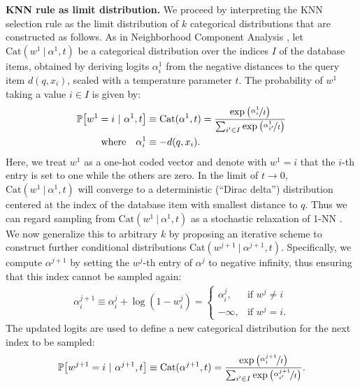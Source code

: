 \documentclass{article}
\newcommand{\myparagraph}[1]{\smallskip\noindent\textbf{#1}}
\newcommand\dist{d}
\newcommand\q{q}
\newcommand\kk{k}
\newcommand\db{x}
\newcommand\dbI{I}
\newcommand\prob{\mathbb{P}}
\newcommand\tcat{t}
\newcommand\Cat{\text{Cat}}
\newcommand\logit{\alpha}
\newcommand\w{w}
\newcommand\given{\ | \ }
\begin{document}
\myparagraph{KNN rule as limit distribution.}
We proceed by interpreting the KNN selection rule as the limit distribution of $\kk$ categorical distributions that are constructed as follows. 
As in Neighborhood Component Analysis \cite{Goldberger:2005:NCA},
let $\Cat(\w^1 \given \logit^1, \tcat)$
be a categorical distribution over the indices $\dbI$ of the database items, obtained by deriving logits $\logit^1_i$ from the negative distances to the query item $\dist(\q, \db_i)$, scaled with a temperature parameter $\tcat$. 
The probability of $\w^1$ taking a value $i \in \dbI$ is given by:
\begin{align}
\prob\big[\w^1 = i \given \logit^{1}, \tcat\big] &\equiv \Cat(\logit^1, \tcat) = 
\frac{\exp \left(\nicefrac{\logit^1_i}{\tcat} \right)}
{\sum_{i' \in \dbI} \exp \left(\nicefrac{\logit^1_{i'}}{\tcat} \right)} \\
 \text{where}\quad \logit^1_i &\equiv -\dist(\q,\db_i). \label{eq:cat_sample_1}
\end{align}
Here, we treat $\w^1$ as a one-hot coded vector and denote with $\w^1=i$ that the $i$-th entry is set to one while the others are zero. 
In the limit of $\tcat \to 0$, $\Cat(\w^1 \given \logit^1 , \tcat)$ will converge to a deterministic (``Dirac delta'') distribution centered at the index of the database item with smallest distance to $\q$.
Thus we can regard sampling from $\Cat(\w^1 \given \logit^1 , \tcat)$ as a stochastic relaxation of 1-NN \cite{Goldberger:2005:NCA}.
We now generalize this to arbitrary $k$ by proposing an iterative scheme to construct further conditional distributions $\Cat(\w^{j+1} \given \logit^{j+1}, \tcat)$. 
Specifically, we compute $\logit^{j+1}$ by setting the $\w^j$-th entry of $\logit^j$
to negative infinity, thus ensuring that this index cannot be sampled again:
\begin{align}
\logit^{j+1}_i \equiv \logit^j_i + \log(1-\w^j_i) = 
\begin{cases}
\logit^{j}_i, & \text{if } \w^j \neq i \\
-\infty, &\text{if } \w^j = i.
\end{cases} \label{eq:disc_logitadjust}
\end{align}
The updated logits are used to define a new categorical distribution for the
next index to be sampled:
\begin{align}
\prob\big[\w^{j+1} = i \given \logit^{j+1}, \tcat\big] \equiv  \Cat(\logit^{j+1}, \tcat) = 
\frac{\exp \left(\nicefrac{\logit^{j+1}_i}{\tcat} \right)}
{\sum_{i' \in \dbI} \exp \left(\nicefrac{\logit^{j+1}_{i'}}{\tcat} \right)}. \label{eq:cat_sample_iplusone}
\end{align}
\end{document}
